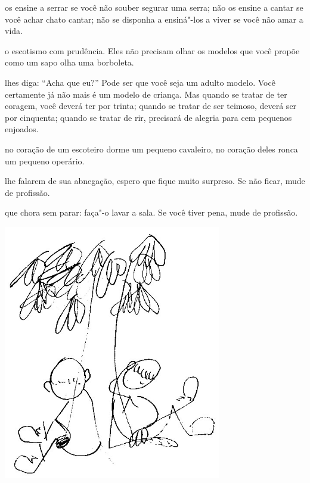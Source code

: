  os ensine a serrar se você não souber segurar uma serra; não os
ensine a cantar se você achar chato cantar; não se disponha a ensiná"-los
a viver se você não amar a vida.



\pagebreak


 o escotismo com prudência. Eles não precisam olhar os modelos que
você propõe como um sapo olha uma borboleta.



 lhes diga: ``Acha que eu?'' Pode ser que você seja um adulto modelo.
Você certamente já não mais é um modelo de criança. Mas quando se tratar
de ter coragem, você deverá ter por trinta; quando se tratar de ser
teimoso, deverá ser por cinquenta; quando se tratar de rir, precisará de
alegria para cem pequenos enjoados.



 no coração de um escoteiro dorme um pequeno cavaleiro, no coração
deles ronca um pequeno operário.



 lhe falarem de sua abnegação, espero que fique muito surpreso. Se
não ficar, mude de profissão.



 que chora sem parar: faça"-o lavar a sala. Se você tiver pena,
mude de profissão.



\pagebreak
\thispagestyle{empty}

\begin{vplace}[.50]
\begin{center}
\includegraphics[width=95mm]{./imgs/Image_8.jpg}
\end{center}
\end{vplace}

